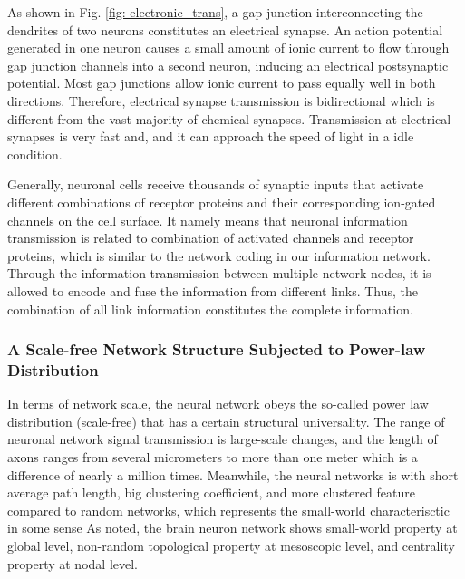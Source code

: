 \documentclass[journal,comsoc]{IEEEtran}
\begin{document}
				As shown in Fig. \ref{fig: electronic_trans}, a gap junction interconnecting the dendrites of two neurons constitutes an electrical synapse.
				An action potential generated in one neuron causes a small amount of ionic current to flow through gap junction channels into a second neuron, 
				inducing an electrical postsynaptic potential.	
				Most gap junctions allow ionic current to pass equally well in both directions.
				Therefore, electrical synapse transmission is bidirectional which is different from the vast majority of chemical synapses.
				Transmission at electrical synapses is very fast and, and it can approach the speed of light in a idle condition. 
				
				Generally, neuronal cells receive thousands of synaptic inputs that activate different combinations of receptor proteins and their corresponding ion-gated channels on the cell surface.
				It namely means that neuronal information transmission is related to combination of activated channels and receptor proteins, which is similar to the network coding in our information network. 
				Through the information transmission between multiple network nodes, it is allowed to encode and fuse the information from different links. 
				Thus, the combination of all link information constitutes the complete information.		
				
			\subsubsection{A Scale-free Network Structure Subjected to Power-law Distribution}
			
				In terms of network scale, the neural network obeys the so-called power law distribution (scale-free) that has a certain structural universality\cite{bibid}.
				The range of neuronal network signal transmission is large-scale changes, and the length of axons ranges from several micrometers to more than one meter which is a difference of nearly a million times.
				Meanwhile, the neural networks is with short average path length, big clustering coefficient, and more clustered feature compared to random networks, which represents the small-world characterisctic in some sense\cite{eguiluz2005scale}
				As \cite{papo2014complex} noted, the brain neuron network shows small-world property at global level, non-random topological property at mesoscopic level, and centrality property at nodal level. 
			
\end{document}
